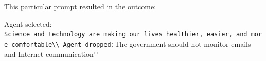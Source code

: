 \documentclass[]{ceurart}
\begin{document}
This particular prompt resulted in the outcome:

Agent selected:
\texttt{Science\ and\ technology\ are\ making\ our\ lives\ healthier,\ easier,\ and\ more\ comfortable\textquotesingle{}\textquotesingle{}\textbackslash{}\textbackslash{}\ Agent\ dropped:}The
government should not monitor emails and Internet communication'\,'



\end{document}

